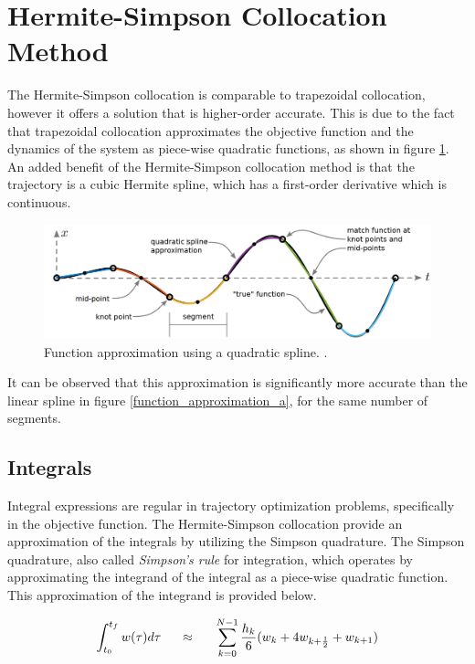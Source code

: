 \documentclass{thesisreport}
\begin{document}
 

\section{Hermite-Simpson Collocation Method}

The Hermite-Simpson collocation is  comparable to trapezoidal collocation, however it offers a solution that is higher-order accurate. This is due to the fact that trapezoidal collocation approximates the objective function and the dynamics of the system as piece-wise quadratic functions, as shown in figure \ref{function_approximation_b}. An added benefit of the Hermite-Simpson collocation method is that the trajectory is a cubic Hermite spline, which has a first-order derivative which is continuous.


 \begin{figure}[h]
 \centering
 \includegraphics[width=\textwidth]{Images/Trajectory/Function_approximation_b}
 \caption{Function approximation using a quadratic spline.  \cite{Kelly2017}.}
 \label{function_approximation_b}
 \end{figure} 
 
It can be observed that this approximation is significantly more accurate than the linear spline in figure \ref{function_approximation_a}, for the same number of segments.
 
 
 
 \subsection{Integrals}
 
 Integral expressions are regular in trajectory optimization problems, specifically in the objective function. The Hermite-Simpson collocation provide an approximation of the integrals by utilizing the Simpson quadrature. The Simpson quadrature, also called \textit{Simpson's rule} for integration, which operates by approximating the integrand of the integral as a piece-wise quadratic function. This approximation of the integrand is provided below. 
 
\begin{equation*}
\int_{t_0}^{t_f} w(\tau) d \tau \text{\hspace{0.5cm}}  \approx \text{\hspace{0.5cm}}  \sum\limits_{k=0}^{N-1} \frac{h_k}{6} ( w_k + 4 w_{k + \frac{1}{2}} + w_{k+1})
\end{equation*}  
  
\end{document}

